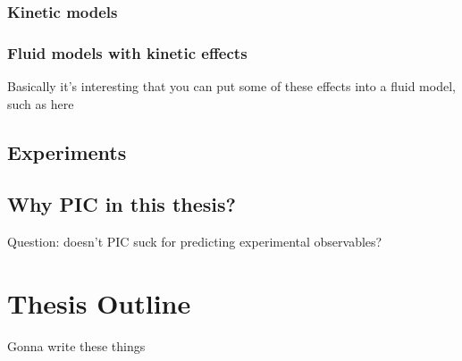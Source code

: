\subsubsection{Kinetic models}
\subsubsection{Fluid models with kinetic effects}
Basically it's interesting that you can put some of these effects into a fluid model, such as here \citep{Tran2020}
\subsection{Experiments}

\subsection{Why PIC in this thesis?}
Question: doesn't PIC suck for predicting experimental observables? 

\section{Thesis Outline}
Gonna write these things

%
%
